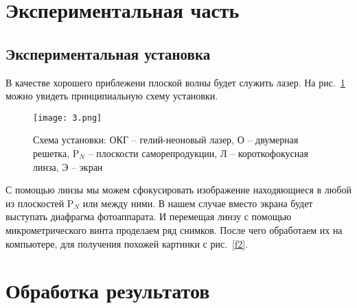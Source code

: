 \documentclass{urticle}
\begin{document}
\newpage    
\section{Экспериментальная часть}
\subsection{Экспериментальная установка}

    В качестве хорошего приблежени плоской волны будет служить лазер. На рис.~\ref{f3} можно увидеть принципиальную схему установки. 
    \begin{figure}[h]
        \begin{center}
            \texttt{[image: 3.png]}
        \end{center}
        \caption{Схема установки: ОКГ -- гелий-неоновый лазер, О -- двумерная решетка, P$_N$ -- плоскости саморепродукции, Л -- короткофокусная линза, Э -- экран}
        \label{f3}
    \end{figure}
    
    С помощью линзы мы можем сфокусировать изображение находяющиеся в любой из плоскостей P$_N$ или между ними. В нашем случае вместо экрана будет выступать диафрагма фотоаппарата. И перемещая линзу с помощью микрометрического винта проделаем ряд снимков. После чего обработаем их на компьютере, для получения похожей картинки с рис.~\ref{f2}.
    
\section{Обработка результатов}
\end{document}
